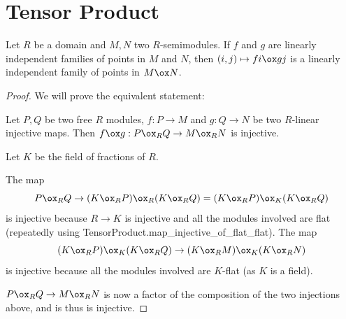 \section{Tensor Product}


\begin{lemma}
  \label{0-tensor-lin-indep}
  \uses{}
  \leanok
  \mathlibok

  Let $R$ be a domain and $M, N$ two $R$-semimodules.
  If $f$ and $g$ are linearly independent families of points in $M$ and $N$, then $(i, j) \mapsto f i \ox g j$ is a linearly independent family of points in $M \ox N$.
\end{lemma}
\begin{proof}
  \uses{}
  \leanok
  We will prove the equivalent statement:

  Let $P, Q$ be two free $R$ modules, $f : P \to M$ and $g : Q \to N$ be two $R$-linear injective maps.
  Then $f \ox g : P \ox_R Q \to M \ox_R N$ is injective.

  Let $K$ be the field of fractions of $R$.

  The map
  \[ P \ox_R Q \to (K \ox_R P) \ox_R (K \ox_R Q) = (K \ox_R P) \ox_K (K \ox_R Q) \]
  is injective because $R \to K$ is injective and all the modules involved are flat
  (repeatedly using TensorProduct.map_injective_of_flat_flat).
  The map
  \[ (K \ox_R P) \ox_K (K \ox_R Q) \to (K \ox_R M) \ox_K (K \ox_R N) \]
  is injective because all the modules involved are $K$-flat (as $K$ is a field).

  $P \ox_R Q \to M \ox_R N$ is now a factor of the composition of the two injections above, and is thus is injective.
\end{proof}
